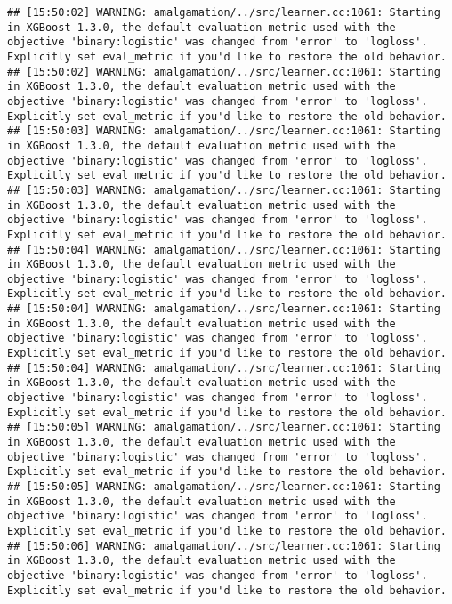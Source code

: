 \documentclass[
]{book}
\begin{document}
\begin{verbatim}
## [15:50:02] WARNING: amalgamation/../src/learner.cc:1061: Starting in XGBoost 1.3.0, the default evaluation metric used with the objective 'binary:logistic' was changed from 'error' to 'logloss'. Explicitly set eval_metric if you'd like to restore the old behavior.
## [15:50:02] WARNING: amalgamation/../src/learner.cc:1061: Starting in XGBoost 1.3.0, the default evaluation metric used with the objective 'binary:logistic' was changed from 'error' to 'logloss'. Explicitly set eval_metric if you'd like to restore the old behavior.
## [15:50:03] WARNING: amalgamation/../src/learner.cc:1061: Starting in XGBoost 1.3.0, the default evaluation metric used with the objective 'binary:logistic' was changed from 'error' to 'logloss'. Explicitly set eval_metric if you'd like to restore the old behavior.
## [15:50:03] WARNING: amalgamation/../src/learner.cc:1061: Starting in XGBoost 1.3.0, the default evaluation metric used with the objective 'binary:logistic' was changed from 'error' to 'logloss'. Explicitly set eval_metric if you'd like to restore the old behavior.
## [15:50:04] WARNING: amalgamation/../src/learner.cc:1061: Starting in XGBoost 1.3.0, the default evaluation metric used with the objective 'binary:logistic' was changed from 'error' to 'logloss'. Explicitly set eval_metric if you'd like to restore the old behavior.
## [15:50:04] WARNING: amalgamation/../src/learner.cc:1061: Starting in XGBoost 1.3.0, the default evaluation metric used with the objective 'binary:logistic' was changed from 'error' to 'logloss'. Explicitly set eval_metric if you'd like to restore the old behavior.
## [15:50:04] WARNING: amalgamation/../src/learner.cc:1061: Starting in XGBoost 1.3.0, the default evaluation metric used with the objective 'binary:logistic' was changed from 'error' to 'logloss'. Explicitly set eval_metric if you'd like to restore the old behavior.
## [15:50:05] WARNING: amalgamation/../src/learner.cc:1061: Starting in XGBoost 1.3.0, the default evaluation metric used with the objective 'binary:logistic' was changed from 'error' to 'logloss'. Explicitly set eval_metric if you'd like to restore the old behavior.
## [15:50:05] WARNING: amalgamation/../src/learner.cc:1061: Starting in XGBoost 1.3.0, the default evaluation metric used with the objective 'binary:logistic' was changed from 'error' to 'logloss'. Explicitly set eval_metric if you'd like to restore the old behavior.
## [15:50:06] WARNING: amalgamation/../src/learner.cc:1061: Starting in XGBoost 1.3.0, the default evaluation metric used with the objective 'binary:logistic' was changed from 'error' to 'logloss'. Explicitly set eval_metric if you'd like to restore the old behavior.

\end{verbatim}
\end{document}
